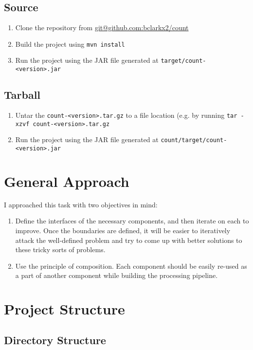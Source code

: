 \documentclass{article}
\begin{document}
\subsection{Source}

\begin{enumerate}
 \item Clone the repository from \url{git@github.com:bclarkx2/count}
 \item Build the project using \texttt{mvn install}
 \item Run the project using the JAR file generated at \texttt{target/count-<version>.jar}
\end{enumerate}

\subsection{Tarball}

\begin{enumerate}
 \item Untar the \texttt{count-<version>.tar.gz} to a file location (e.g. by running \texttt{tar -xzvf count-<version>.tar.gz}
 \item Run the project using the JAR file generated at \texttt{count/target/count-<version>.jar}
\end{enumerate}


\section{General Approach}
I approached this task with two objectives in mind:

\begin{enumerate}
 \item Define the interfaces of the necessary components, and then iterate on each to improve. Once the boundaries are defined, it will be easier to iteratively attack the well-defined problem and try to come up with better solutions to these tricky sorts of problems.
 \item Use the principle of composition. Each component should be easily re-used as a part of another component while building the processing pipeline.
\end{enumerate}

\section{Project Structure}

\subsection{Directory Structure}
\end{document}
